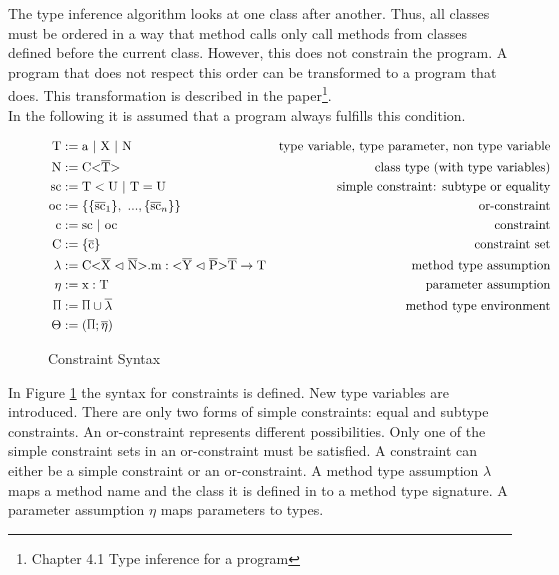 The type inference algorithm looks at one class after another. Thus, all classes must be ordered in a way that method calls only call methods from classes defined before the current class.
However, this does not constrain the program. A program that does not respect this order can be transformed to a program that does.
This transformation is described in the paper\footnote{Chapter 4.1 Type inference for a program}.
\\
In the following it is assumed that a program always fulfills this condition.

\begin{figure}[tp]
    \begin{align*}
        \text{T} &:= \text{a} \ | \ \text{X} \ | \ \text{N} &\text{type variable, type parameter, non type variable} \\
        \text{N} &:= \text{C} \vv{\ot{T}} &\text{class type (with type variables)}\\
        \text{sc} &:= \text{T} < \text{U} \ | \ \text{T} = \text{U} &\text{simple constraint: subtype or equality}\\
        \text{oc} &:= \{ \{ \ot{sc}_1 \}, \ ..., \{ \ot{sc}_n \} \} &\text{or-constraint}\\
        \text{c} &:= \text{sc} \ | \ \text{oc} &\text{constraint}\\
        \text{C} &:= \{ \ot{c} \} &\text{constraint set}\\
        \lambda &:= \cm : \yp \oto{\text{T}} &\text{method type assumption}\\
        \eta &:= \text{x} : \text{T} &\text{parameter assumption}\\
        \sprod{0.7} &:= \sprod{0.7} \cup \overline{\lambda} &\text{method type environment}\\
        \Theta &:= ( \sprod{0.7}; \overline{\eta} )
    \end{align*}
    \caption{Constraint Syntax}
    \label{constraint_syntax}
\end{figure}

In Figure \ref{constraint_syntax} the syntax for constraints is defined. New type variables  are introduced. There are only two forms of simple constraints: equal and subtype constraints. An or-constraint represents different possibilities. Only one of the simple constraint sets in an or-constraint must be satisfied.
A constraint can either be a simple constraint or an or-constraint. A method type assumption $\lambda$ maps a method name and the class it is defined in to a method type signature. A parameter assumption $\eta$ maps parameters to types.

